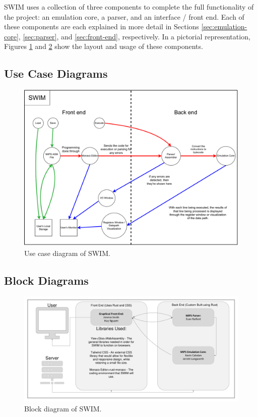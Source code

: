 \documentclass[
    paper=letter,
    parskip=half,
    fontsize=12pt,
    titlepage=firstiscover,
    toc=bibliography,
    numbers=endperiod
]{scrartcl}
\begin{document}
SWIM uses a collection of three components to complete the full
functionality of the project: an emulation core, a parser, and an
interface / front end. Each of these components are each explained in
more detail in Sections \ref{sec:emulation-core}, \ref{sec:parser}, and
\ref{sec:front-end}, respectively. In a pictorial representation,
Figures \ref{fig:use-case-diagram} and \ref{fig:block-diagram} show the
layout and usage of these components.

\subsection{Use Case Diagrams}

\begin{figure}[H]
    \includegraphics[width=\textwidth]{use-case-diagram}
    \caption{Use case diagram of SWIM.}
    \label{fig:use-case-diagram}
\end{figure}

\subsection{Block Diagrams}

\begin{figure}[H]
    \includegraphics[width=\textwidth]{block-diagram}
    \caption{Block diagram of SWIM.}
    \label{fig:block-diagram}
\end{figure}
\end{document}

